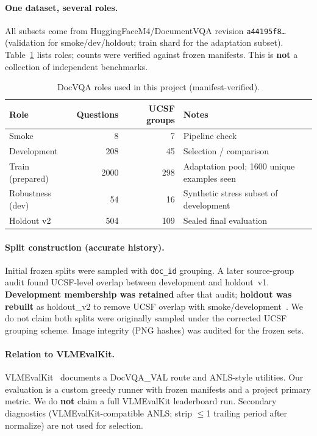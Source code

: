 \documentclass[11pt,a4paper]{article}
\begin{document}
\paragraph{One dataset, several roles.}
All subsets come from HuggingFaceM4/DocumentVQA revision \texttt{a44195f8\ldots} (validation for smoke/dev/holdout; train shard for the adaptation subset).
Table~\ref{tab:data} lists roles; counts were verified against frozen manifests.
This is \textbf{not} a collection of independent benchmarks.

\begin{table}[H]
\centering
\caption{DocVQA roles used in this project (manifest-verified).}
\label{tab:data}
\begin{tabular}{@{}lrrp{5.2cm}@{}}
\toprule
Role & Questions & UCSF groups & Notes \\
\midrule
Smoke & 8 & 7 & Pipeline check \\
Development & 208 & 45 & Selection / comparison \\
Train (prepared) & 2000 & 298 & Adaptation pool; 1600 unique examples seen \\
Robustness (dev) & 54 & 16 & Synthetic stress subset of development \\
Holdout v2 & 504 & 109 & Sealed final evaluation \\
\bottomrule
\end{tabular}
\end{table}

\paragraph{Split construction (accurate history).}
Initial frozen splits were sampled with \texttt{doc\_id} grouping.
A later source-group audit found UCSF-level overlap between development and holdout~v1.
\textbf{Development membership was retained} after that audit; \textbf{holdout was rebuilt} as holdout\_v2 to remove UCSF overlap with smoke/development~\citep{mathew2021docvqa}.
We do not claim both splits were originally sampled under the corrected UCSF grouping scheme.
Image integrity (PNG hashes) was audited for the frozen sets.

\paragraph{Relation to VLMEvalKit.}
VLMEvalKit~\citep{duan2024vlmevalkit} documents a DocVQA\_VAL route and ANLS-style utilities.
Our evaluation is a custom greedy runner with frozen manifests and a project primary metric.
We do \textbf{not} claim a full VLMEvalKit leaderboard run.
Secondary diagnostics (VLMEvalKit-compatible ANLS; strip $\le$1 trailing period after normalize) are not used for selection.
\end{document}

